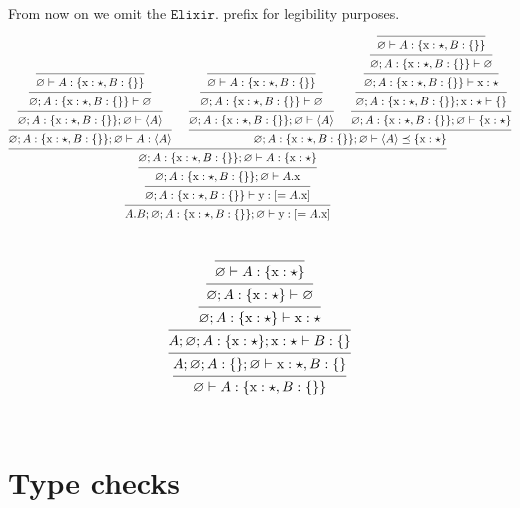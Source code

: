 \documentclass[12pt]{article}
\newcommand{\tx}{\text{\rm x}}
\newcommand{\ty}{\text{\rm y}}
\newcommand{\emptyenv}{\varnothing}
\newcommand{\Elixir}{\texttt{Elixir}}
\begin{document}
From now on we omit the $\Elixir.$ prefix for legibility purposes.
\[
    \begin{prooftree}

        \infer0{ \emptyenv \vdash A : \{ \tx : \star, B : \{\} \} }
        \infer1{ \emptyenv; A : \{ \tx : \star, B : \{\} \} \vdash \emptyenv}
        \infer1{ \emptyenv; A : \{ \tx : \star, B : \{\} \}; \emptyenv \vdash \langle A \rangle }
        \infer1{ \emptyenv; A : \{ \tx : \star, B : \{\} \}; \emptyenv \vdash A : \langle A \rangle }

        \infer0{\emptyenv \vdash A : \{ \tx : \star, B : \{\} \} }
        \infer1{\emptyenv; A : \{ \tx : \star, B : \{\} \} \vdash \emptyenv }
        \infer1{\emptyenv; A : \{ \tx : \star, B : \{\} \}; \emptyenv \vdash \langle A \rangle  }

        \infer0{\emptyenv \vdash A : \{ \tx : \star, B : \{\} \} }
        \infer1{\emptyenv; A : \{ \tx : \star, B : \{\} \} \vdash \emptyenv }
        \infer1{\emptyenv; A : \{ \tx : \star, B : \{\} \} \vdash \tx : \star }
        \infer1{\emptyenv; A : \{ \tx : \star, B : \{\} \}; \tx : \star \vdash \{ \}  }
        \infer1{\emptyenv; A : \{ \tx : \star, B : \{\} \}; \emptyenv \vdash \{ \tx : \star \}  }
        \infer2{ \emptyenv; A : \{ \tx : \star, B : \{\} \}; \emptyenv \vdash \langle A \rangle \preceq \{ \tx : \star \} }

        \infer2{ \emptyenv; A : \{ \tx : \star, B : \{\} \}; \emptyenv \vdash A : \{ \tx : \star \} }
        \infer1{ \emptyenv; A : \{ \tx : \star, B : \{\} \}; \emptyenv \vdash A.\tx }
        \infer1{ \emptyenv; A : \{ \tx : \star, B : \{\} \} \vdash \ty : [= A.\tx] }
        \infer1{ A.B; \emptyenv; A : \{ \tx : \star, B : \{\} \}; \emptyenv \vdash \ty : [= A.\tx] }
    \end{prooftree}
\] \\
\[
    \begin{prooftree}
        \infer0{ \emptyenv \vdash A : \{ \tx : \star \} }
        \infer1{ \emptyenv; A : \{ \tx : \star \} \vdash \emptyenv }
        \infer1{ \emptyenv; A : \{ \tx : \star \} \vdash \tx : \star }
        \infer1{ A; \emptyenv; A : \{ \tx : \star \}; \tx : \star \vdash B : \{\} }
        \infer1{ A; \emptyenv; A : \{\}; \emptyenv \vdash \tx : \star, B : \{\} }
        \infer1{ \emptyenv \vdash A : \{ \tx : \star, B : \{\} \} }
    \end{prooftree}
\] \\

\section{Type checks}
\end{document}
